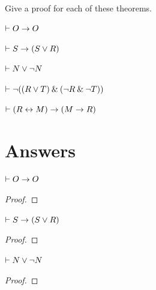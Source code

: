 {{{{{{{{{\begin{small}

Give a proof for each of these theorems.
\begin{earg}
\item $\vdash O \rightarrow O$\smallskip
\item $\vdash S \rightarrow (S \vee R)$\smallskip
\item $\vdash N \vee {\neg} N$\smallskip
\item $\vdash {\neg}((R \vee T) \mathbin{\&} ({\neg} R  \mathbin{\&} {\neg} T))$\smallskip
\item $\vdash (R \leftrightarrow M) \rightarrow (M \rightarrow R)$\smallskip
\end{earg}





\section{Answers}



\begin{earg}

\noindent\begin{minipage}{0.99\textwidth}
\item $\vdash O \rightarrow O$
\begin{proof}
\open
	 \as{}
\close
{}
\end{proof}
\bigskip
\end{minipage}

\noindent\begin{minipage}{0.99\textwidth}
\item $\vdash S \rightarrow (S \vee R)$
\begin{proof}
\open
	 \as{}
	 
	 
\close
{}
\end{proof}
\medskip
\end{minipage}

\noindent\begin{minipage}{0.99\textwidth}
\item $\vdash N \vee {\neg} N$
\begin{proof}
\open
         \as{}
        \open
                 \as{}
                 
        \close
         
         
         
\close
{} 
\end{proof}\end{minipage}
\medskip



\end{earg}
\end{small}}}}}}}}}}
